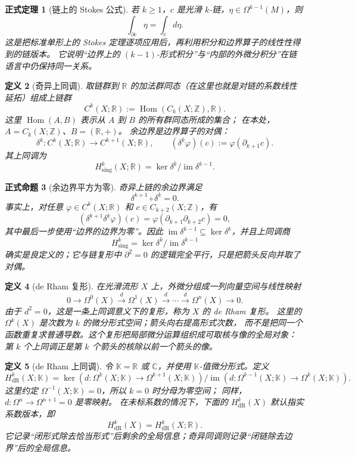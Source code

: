 \documentclass[UTF8,fontset=none,a4paper,11pt]{ctexart}
\theoremstyle{foundation-definition}
\newtheorem{definition}{定义}[section]
\theoremstyle{foundation-theorem}
\newtheorem{theorem}[definition]{正式定理}
\theoremstyle{foundation-proposition}
\newtheorem{proposition}[definition]{正式命题}
\theoremstyle{foundation-example}
\theoremstyle{foundation-remark}
\theoremstyle{foundation-theorem}
\begin{document}
\begin{theorem}[链上的 Stokes 公式]\label{thm:chain-stokes}
若 \(k\geq1\)，\(c\) 是光滑 \(k\)-链，\(\eta\in\Omega^{k-1}(M)\)，则
\[
\int_{\partial c}\eta=\int_c d\eta.
\]
这是把标准单形上的 Stokes 定理逐项应用后，再利用积分和边界算子的线性性得到的链版本。
它说明“边界上的 \((k-1)\)-形式积分”与“内部的外微分积分”在链语言中仍保持同一关系。
\end{theorem}

\begin{definition}[奇异上同调]\label{def:singular-cohomology}
取链群到 \(\mathbb R\) 的加法群同态（在这里也就是对链的系数线性延拓）组成上链群
\[
C^k(X;\mathbb R):=\operatorname{Hom}(C_k(X;\mathbb Z),\mathbb R).
\]
这里 \(\operatorname{Hom}(A,B)\) 表示从 \(A\) 到 \(B\) 的所有群同态所成的集合；
在本处，\(A=C_k(X;\mathbb Z)\)、\(B=(\mathbb R,+)\)。
余边界是边界算子的对偶：
\[
\delta^k:C^k(X;\mathbb R)\to C^{k+1}(X;\mathbb R),
\qquad
(\delta^k\varphi)(c):=\varphi(\partial_{k+1}c).
\]
其上同调为
\[
H^k_{\mathrm{sing}}(X;\mathbb R)
=\ker\delta^k/\operatorname{im}\delta^{k-1}.
\]
\end{definition}

\begin{proposition}[余边界平方为零]\label{prop:cochain-square-zero}
奇异上链的余边界满足
\[
\delta^{k+1}\circ\delta^k=0.
\]
事实上，对任意 \(\varphi\in C^k(X;\mathbb R)\) 和 \(c\in C_{k+2}(X;\mathbb Z)\)，有
\[
(\delta^{k+1}\delta^k\varphi)(c)
=\varphi(\partial_{k+1}\partial_{k+2}c)=0,
\]
其中最后一步使用“边界的边界为零”。因此
\(\operatorname{im}\delta^{k-1}\subseteq\ker\delta^k\)，并且上同调商
\[
H^k_{\mathrm{sing}}=\ker\delta^k/\operatorname{im}\delta^{k-1}
\]
确实是良定义的；它与链复形中 \(\partial^2=0\) 的逻辑完全平行，只是把箭头反向并取了对偶。
\end{proposition}

\begin{definition}[de Rham 复形]\label{def:de-rham-complex}
在光滑流形 \(X\) 上，外微分组成一列向量空间与线性映射
\[
0\longrightarrow\Omega^0(X)
\xrightarrow{d}\Omega^1(X)
\xrightarrow{d}\cdots
\xrightarrow{d}\Omega^n(X)
\longrightarrow0.
\]
由于 \(d^2=0\)，这是一条上同调意义下的复形，称为 \(X\) 的 de Rham 复形。
这里的 \(\Omega^k(X)\) 是次数为 \(k\) 的微分形式空间；箭头向右提高形式次数，
而不是把同一个函数重复求普通导数。这个复形把局部微分运算组织成可取核与像的全局对象：
第 \(k\) 个上同调正是第 \(k\) 个箭头的核除以前一个箭头的像。
\end{definition}

\begin{definition}[de Rham 上同调]\label{def:de-rham-cohomology}
令 \(\mathbb K=\mathbb R\) 或 \(\mathbb C\)，并使用 \(\mathbb K\)-值微分形式。定义
\[
H^k_{\mathrm{dR}}(X;\mathbb K)=
\ker(d:\Omega^k(X;\mathbb K)\to\Omega^{k+1}(X;\mathbb K))
/\operatorname{im}(d:\Omega^{k-1}(X;\mathbb K)\to\Omega^k(X;\mathbb K)).
\]
这里约定 \(\Omega^{-1}(X;\mathbb K)=0\)，所以 \(k=0\) 时分母为零空间；
同样，\(d:\Omega^n\to\Omega^{n+1}=0\) 是零映射。
在未标系数的情况下，下面的 \(H^k_{\mathrm{dR}}(X)\) 默认指实系数版本，即
\[
H^k_{\mathrm{dR}}(X)=H^k_{\mathrm{dR}}(X;\mathbb R).
\]
它记录“闭形式除去恰当形式”后剩余的全局信息；奇异同调则记录“闭链除去边界”后的全局信息。
\end{definition}
\end{document}
